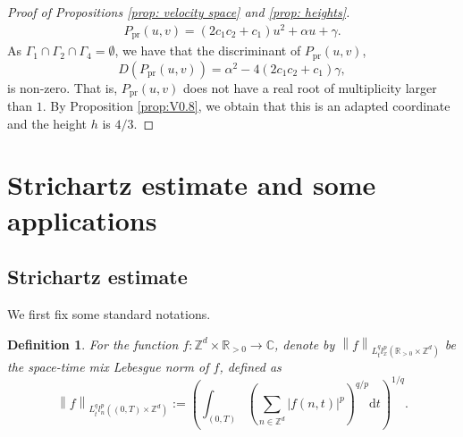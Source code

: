 \documentclass[12pt]{amsart}
\newtheorem{definition}{Definition}[section]
\newcommand\norm[1]{\left\|#1\right\|}
\newcommand{\R}{\mathbb{R}}
\newcommand{\C}{\mathbb{C}}
\newcommand{\Z}{\mathbb{Z}}
\def\d{\mathrm{d}}
\begin{document}
\begin{proof}[Proof of Propositions \ref{prop: velocity space} and \ref{prop: heights}]
\begin{equation*}
    \begin{aligned}
        P_{\mathrm{pr}}\left(u,v\right)=\left(2c_1c_2+c_1\right)u^2+\alpha u+\gamma.
    \end{aligned}
\end{equation*}
As $\Gamma_{1}\cap\Gamma_{2}\cap\Gamma_{4}=\emptyset$, we have that the discriminant of $P_{\mathrm{pr}}\left(u,v\right)$, 
\begin{equation}\label{coe:discriminant}
D(P_{\mathrm{pr}}(u,v))=\alpha^2-4(2c_1c_2+c_1)\gamma,
\end{equation}
is non-zero. That is, $P_{\mathrm{pr}}(u,v)$ does not have a real root of multiplicity larger than $1$. By Proposition \ref{prop:V0.8}, we obtain that this is an adapted coordinate and the height $h$ is $4/3$.
\end{proof}

		
		
		
		
	
	
	
	
	
	
	
	
	
	\section{Strichartz estimate and some applications}\label{sec4}
	\subsection{Strichartz estimate}\label{subsec3.1}
	We first fix some standard notations.
	\begin{definition}
		For the function $f:\Z^{d}\times\R_{>0}\to\C$, denote by $\norm{f}_{L^{q}_{t}l^{p}_{x}\left(\R_{>0}\times\Z^{d}\right)}$ be the space-time mix Lebesgue norm of $f$, defined as 
		\begin{equation*}
			\norm{f}_{L^{q}_{t}l^{p}_{n}\left(\left(0,T\right)\times\Z^{d}\right)}:=\left(\int_{\left(0,T\right)}\left(\sum_{n\in\Z^{d}}\left|f\left(n,t\right)\right|^{p}\right)^{q/p}\d t\right)^{1/q}.
		\end{equation*}
	\end{definition}
	
\end{document}
